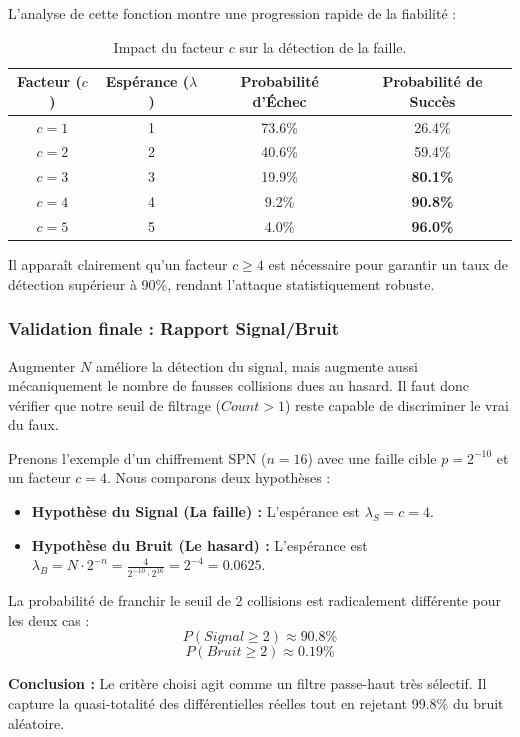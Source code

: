 \documentclass{article}
\begin{document}
    L'analyse de cette fonction montre une progression rapide de la fiabilité :

    \begin{table}[H]
        \centering
        \begin{tabular}{|c|c|c|c|}
            \hline
            \textbf{Facteur ($c$)} & \textbf{Espérance ($\lambda$)} & \textbf{Probabilité d'Échec} & \textbf{Probabilité de Succès} \\
            \hline
            $c=1$ & 1 & 73.6\% & 26.4\% \\
            \hline
            $c=2$ & 2 & 40.6\% & 59.4\% \\
            \hline
            $c=3$ & 3 & 19.9\% & \textbf{80.1\%} \\
            \hline
            $c=4$ & 4 & 9.2\% & \textbf{90.8\%} \\
            \hline
            $c=5$ & 5 & 4.0\% & \textbf{96.0\%} \\
            \hline
        \end{tabular}
        \caption{Impact du facteur $c$ sur la détection de la faille.}
        \label{tab:poisson_c}
    \end{table}

    Il apparaît clairement qu'un facteur $c \ge 4$ est nécessaire pour garantir un taux de détection supérieur à 90\%, rendant l'attaque statistiquement robuste.

    \subsubsection{Validation finale : Rapport Signal/Bruit}

    Augmenter $N$ améliore la détection du signal, mais augmente aussi mécaniquement le nombre de fausses collisions dues au hasard. Il faut donc vérifier que notre seuil de filtrage ($Count > 1$) reste capable de discriminer le vrai du faux.

    Prenons l'exemple d'un chiffrement SPN ($n=16$) avec une faille cible $p=2^{-10}$ et un facteur $c=4$. Nous comparons deux hypothèses :
    \begin{itemize}
        \item \textbf{Hypothèse du Signal (La faille) :} L'espérance est $\lambda_S = c = 4$.
        \item \textbf{Hypothèse du Bruit (Le hasard) :} L'espérance est $\lambda_B = N \cdot 2^{-n} = \frac{4}{2^{-10} \cdot 2^{16}} = 2^{-4} = 0.0625$.
    \end{itemize}

    La probabilité de franchir le seuil de 2 collisions est radicalement différente pour les deux cas :
    $$ P(Signal \ge 2) \approx \mathbf{90.8\%} $$
    $$ P(Bruit \ge 2) \approx \mathbf{0.19\%} $$

    \textbf{Conclusion :} Le critère choisi agit comme un filtre passe-haut très sélectif. Il capture la quasi-totalité des différentielles réelles tout en rejetant 99.8\% du bruit aléatoire.
\end{document}

